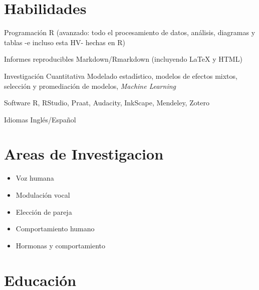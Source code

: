 \documentclass[11pt, a4paper]{awesome-cv}
\providecommand{\tightlist}{%
	\setlength{\itemsep}{0pt}\setlength{\parskip}{0pt}}
\begin{document}
\hypertarget{habilidades}{%
\section{Habilidades}\label{habilidades}}

\begin{cvskills}
  \cvskill
    {Programación}
    {R (avanzado: todo el procesamiento de datos, análisis, diagramas y tablas -e incluso esta HV- hechas en R)}

  \cvskill
    {Informes reproducibles}
    {Markdown/Rmarkdown (incluyendo {\selectfont\LaTeX} y HTML)}

  \cvskill
    {Investigación Cuantitativa}
    {Modelado estadístico, modelos de efectos mixtos, selección y promediación de modelos, \textit{Machine Learning}}

  \cvskill
    {Software}
    {R, RStudio, Praat, Audacity, InkScape, Mendeley, Zotero}

  \cvskill
    {Idiomas}
    {Inglés/Español}
\end{cvskills}

\hypertarget{areas-de-investigacion}{%
\section{Areas de Investigacion}\label{areas-de-investigacion}}

\begin{itemize}
\tightlist
\item
  Voz humana
\item
  Modulación vocal
\item
  Elección de pareja
\item
  Comportamiento humano
\item
  Hormonas y comportamiento
\end{itemize}

\hypertarget{educaciuxf3n}{%
\section{Educación}\label{educaciuxf3n}}
\end{document}
